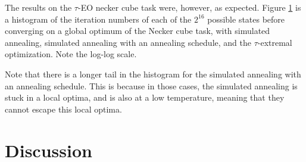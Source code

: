 \documentclass[12pt]{article}
\begin{document}
The results on the $\tau$-EO necker cube task were, however, as expected. Figure \ref{fig:speed} is a histogram of the iteration numbers of each of the $2^16$ possible states before converging on a global optimum of the Necker cube task, with simulated annealing, simulated annealing with an annealing schedule, and the $\tau$-extremal optimization. Note the log-log scale.

\begin{figure}
  \label{fig:speed}
\end{figure}

Note that there is a longer tail in the histogram for the simulated annealing with an annealing schedule. This is because in those cases, the simulated annealing is stuck in a local optima, and is also at a low temperature, meaning that they cannot escape this local optima.






\section{Discussion}
\end{document}
